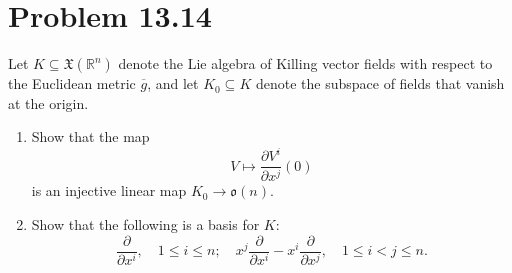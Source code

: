 \documentclass[11pt, letterpaper]{article}
\begin{document}
\section{Problem 13.14}
\begin{problem}
	Let $K\subseteq \mathfrak{X} (\mathbb{R} ^n)$ denote the Lie algebra of Killing vector fields with respect to the Euclidean metric $\overline{g} $, and let $K_0 \subseteq K$ denote the subspace of fields that vanish at the origin.
	\begin{enumerate}
		\item Show that the map
			\[
				V\mapsto \frac{\partial V^i}{\partial x^j} (0)
			\]
			is an injective linear map $K_0 \to \mathfrak{o} (n)$.
		\item Show that the following is a basis for $K$:
			\[
				\frac{\partial }{\partial x^i} ,\quad 1\leq i\leq n;\quad x^j\frac{\partial }{\partial x^i} -x^i \frac{\partial }{\partial x^j} ,\quad 1\leq i<j \leq n
			.\]
	\end{enumerate}
\end{problem}
\end{document}
